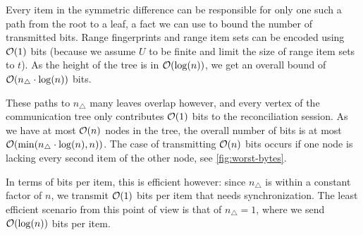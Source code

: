 \documentclass[conference]{IEEEtran}
\begin{document}
Every item in the symmetric difference can be responsible for only one such a path from the root to a leaf, a fact we can use to bound the number of transmitted bits. Range fingerprints and range item sets can be encoded using $\mathcal{O}(1)$ bits (because we assume $U$ to be finite and limit the size of range item sets to $t$). As the height of the tree is in $\mathcal{O}(\log(n))$, we get an overall bound  of $\mathcal{O}(n_{\triangle} \cdot \log(n))$ bits.

These paths to $n_{\triangle}$ many leaves overlap however, and every vertex of the communication tree only contributes $\mathcal{O}(1)$ bits to the reconciliation session. As we have at most $\mathcal{O}(n)$ nodes in the tree, the overall number of bits is at most $\mathcal{O}(\min(n_{\triangle} \cdot \log(n), n))$. The case of transmitting $\mathcal{O}(n)$ bits occurs if one node is lacking every second item of the other node, see \cref{fig:worst-bytes}.

In terms of bits per item, this is efficient however: since $n_{\triangle}$ is within a constant factor of $n$, we transmit $\mathcal{O}(1)$ bits per item that needs synchronization. The least efficient scenario from this point of view is that of $n_{\triangle} = 1$, where we send $\mathcal{O}(\log(n))$ bits per item.
\end{document}
